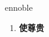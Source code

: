 
\begin{frame}
{\huge ennoble}
\begin{center}
\begin{enumerate}\Large
  \item \textbf{使尊贵}
\end{enumerate}
\end{center}
\end{frame}
